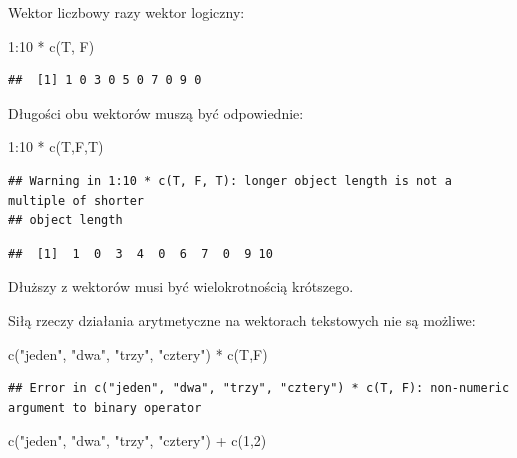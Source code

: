 \documentclass[
]{book}
\newenvironment{Shaded}{\begin{snugshade}}{\end{snugshade}}
\newcommand{\DecValTok}[1]{\textcolor[rgb]{0.00,0.00,0.81}{#1}}
\newcommand{\FunctionTok}[1]{\textcolor[rgb]{0.00,0.00,0.00}{#1}}
\newcommand{\NormalTok}[1]{#1}
\newcommand{\SpecialCharTok}[1]{\textcolor[rgb]{0.00,0.00,0.00}{#1}}
\newcommand{\StringTok}[1]{\textcolor[rgb]{0.31,0.60,0.02}{#1}}
\begin{document}
Wektor liczbowy razy wektor logiczny:

\begin{Shaded}
\begin{Highlighting}[]
\DecValTok{1}\SpecialCharTok{:}\DecValTok{10} \SpecialCharTok{*} \FunctionTok{c}\NormalTok{(T, F)}
\end{Highlighting}
\end{Shaded}

\begin{verbatim}
##  [1] 1 0 3 0 5 0 7 0 9 0
\end{verbatim}

Długości obu wektorów muszą być odpowiednie:

\begin{Shaded}
\begin{Highlighting}[]
\DecValTok{1}\SpecialCharTok{:}\DecValTok{10} \SpecialCharTok{*} \FunctionTok{c}\NormalTok{(T,F,T)}
\end{Highlighting}
\end{Shaded}

\begin{verbatim}
## Warning in 1:10 * c(T, F, T): longer object length is not a multiple of shorter
## object length
\end{verbatim}

\begin{verbatim}
##  [1]  1  0  3  4  0  6  7  0  9 10
\end{verbatim}

Dłuższy z wektorów musi być wielokrotnością krótszego.

Siłą rzeczy działania arytmetyczne na wektorach tekstowych nie są możliwe:

\begin{Shaded}
\begin{Highlighting}[]
\FunctionTok{c}\NormalTok{(}\StringTok{"jeden"}\NormalTok{, }\StringTok{"dwa"}\NormalTok{, }\StringTok{"trzy"}\NormalTok{, }\StringTok{"cztery"}\NormalTok{) }\SpecialCharTok{*} \FunctionTok{c}\NormalTok{(T,F)}
\end{Highlighting}
\end{Shaded}

\begin{verbatim}
## Error in c("jeden", "dwa", "trzy", "cztery") * c(T, F): non-numeric argument to binary operator
\end{verbatim}

\begin{Shaded}
\begin{Highlighting}[]
\FunctionTok{c}\NormalTok{(}\StringTok{"jeden"}\NormalTok{, }\StringTok{"dwa"}\NormalTok{, }\StringTok{"trzy"}\NormalTok{, }\StringTok{"cztery"}\NormalTok{) }\SpecialCharTok{+} \FunctionTok{c}\NormalTok{(}\DecValTok{1}\NormalTok{,}\DecValTok{2}\NormalTok{)}
\end{Highlighting}
\end{Shaded}
\end{document}

